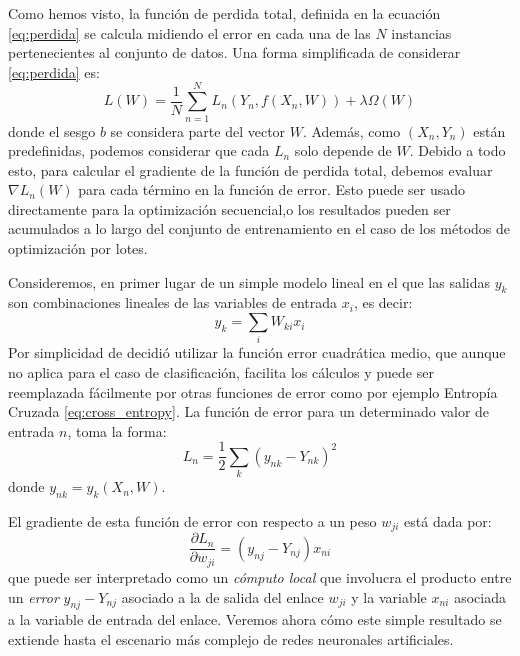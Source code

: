 \documentclass[a4paper,11pt,spanish]{book}
\begin{document}
	Como hemos visto, la función de perdida total, definida en la ecuación \eqref{eq:perdida} se calcula midiendo el error en cada una de las $N$ instancias pertenecientes 
	al conjunto de datos.
	Una forma simplificada de considerar \eqref{eq:perdida} es:
	\begin{equation} \label {eq:perdida_simplificada}
	  L(W) = \frac{1}{N}\sum_{n=1}^{N} L_n(Y_n, f(X_n, W)) + \lambda \Omega(W)
	\end{equation}
	donde el sesgo $b$ se considera parte del vector $W$. Además, como $(X_n, Y_n)$ están predefinidas, podemos considerar que cada $L_n$ solo depende de $W$.
	Debido a todo esto, para calcular el gradiente de la función de perdida total, debemos evaluar $\nabla L_n(W)$ para cada término en la función de error. 
	Esto puede ser usado directamente para la optimización secuencial,o los resultados pueden ser acumulados a lo largo  del conjunto de entrenamiento en el 
	caso de los métodos de optimización por lotes.
	
	Consideremos, en primer lugar de un simple modelo lineal en el que las salidas $y_k$ son combinaciones lineales de las variables de entrada $x_i$, es decir:
	\begin{equation*}
	  y_k = \sum_i W_{ki} x_i
	\end{equation*}
	Por simplicidad de decidió utilizar la función error cuadrática medio, que aunque no aplica para el caso de clasificación, facilita los cálculos y puede
	ser reemplazada fácilmente por otras funciones de error como por ejemplo Entropía Cruzada \eqref{eq:cross_entropy}. 
	La función de error para un determinado valor de entrada $n$, toma la forma:
	\begin{equation*}
	  L_n = \frac{1}{2} \sum_k (y_{nk}-Y_{nk})^2   %
	\end{equation*}
	donde $y_{nk} = y_{k} (X_n , W)$.
	
	El gradiente de esta función de error con respecto a un peso $w_{ji}$ está dada por:
	\begin{equation*}
	  \frac{\partial L_n}{\partial w_{ji}} = (y_{nj} − Y_{nj}) x_{ni}
	\end{equation*}
	que puede ser interpretado como un \emph{cómputo local} que involucra el producto entre un \emph{error} $y_{nj} − Y_{nj}$ asociado a la de salida del enlace $w_{ji}$ y 
	la variable $x_{ni}$ asociada a la variable de entrada del enlace.
	Veremos ahora cómo este simple resultado se extiende hasta el escenario más complejo de redes neuronales artificiales.
\end{document}
